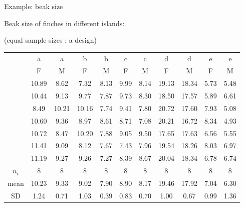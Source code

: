 \begin{frame}{Example: beak size}

    Beak size of finches in different islands: 
    \vspace{2em}

    (equal sample sizes : a  design)
    \vspace{2em}

    { \tiny
\begin{tabular}{c|cccccccccc}
    &   a & a & b & b & c & c & d & d & e & e \\
    &   F & M & F & M & F & M & F & M & F & M \\
    \hline
    & 10.89 & 8.62 & 7.32 & 8.13 & 9.99 & 8.14 & 19.13 & 18.34 & 5.73 & 5.48 \\ 
    & 10.44 & 9.13 & 9.77 & 7.87 & 9.73 & 8.30 & 18.50 & 17.57 & 5.89 & 6.61 \\ 
    & 8.49 & 10.21 & 10.16 & 7.74 & 9.41 & 7.80 & 20.72 & 17.60 & 7.93 & 5.08 \\ 
    & 10.60 & 9.36 & 8.97 & 8.61 & 8.71 & 7.08 & 20.21 & 16.72 & 8.34 & 4.93 \\ 
    & 10.72 & 8.47 & 10.20 & 7.88 & 9.05 & 9.50 & 17.65 & 17.63 & 6.56 & 5.55 \\ 
    & 11.41 & 9.09 & 8.12 & 7.67 & 7.43 & 7.96 & 19.54 & 18.26 & 8.03 & 6.97 \\ 
    & 11.19 & 9.27 & 9.26 & 7.27 & 8.39 & 8.67 & 20.04 & 18.34 & 6.78 & 6.74 \\ 
   \hline
$n_i$  &  8     &  8     &  8     &  8      &  8      &  8      &  8     &  8     &  8      &  8      \\
  mean & 10.23 & 9.33 & 9.02 & 7.90 & 8.90 & 8.17 & 19.46 & 17.92 & 7.04 & 6.30 \\ 
  SD   & 1.24 & 0.71 & 1.03 & 0.39 & 0.83 & 0.70 & 1.00 & 0.67 & 0.99 & 1.36 \\ 
\end{tabular}
}
\end{frame}

